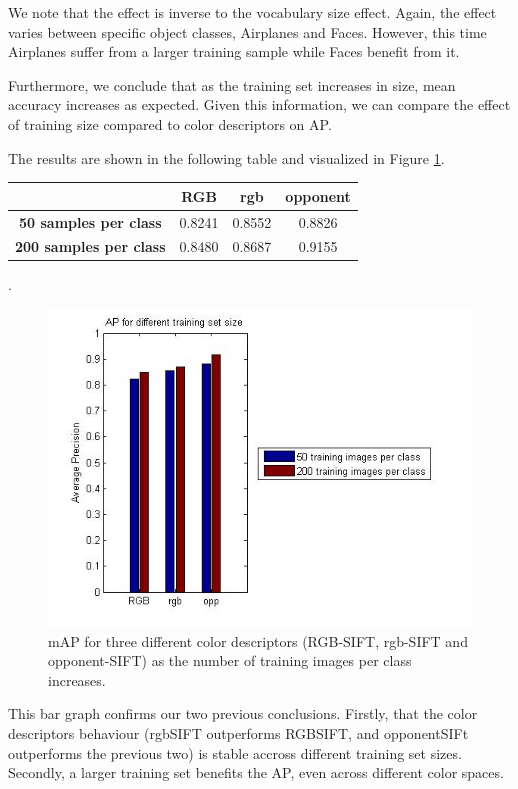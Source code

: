 \documentclass[11pt]{article}
\begin{document}
We note that the effect is inverse to the vocabulary size effect. Again, the effect varies between specific object classes, Airplanes and Faces. However, this time Airplanes suffer from a larger training sample while Faces benefit from it. 

Furthermore, we conclude that as the training set increases in size, mean accuracy increases as expected. Given this information, we can compare the effect of training size compared to color descriptors on AP.

The results are shown in the following table and visualized in Figure \ref{fig:training_size_color}.

\begin{center}
	\begin{tabular}{| c | c | c | c |}
		\hline
		\textbf{} & \textbf{RGB} & \textbf{rgb} & \textbf{opponent} \\ \hline
		\textbf{50 samples per class} & 0.8241 & 0.8552 & 0.8826 \\ \hline
		\textbf{200 samples per class} & 0.8480 & 0.8687 & 0.9155 \\ \hline
		\hline
	\end{tabular}
\end{center}
. 
\begin{figure}[h]
	\centering
	\includegraphics[width=.8\textwidth]{img/training_size_color_descriptor.jpg}
	\caption{mAP for three different color descriptors (RGB-SIFT, rgb-SIFT and opponent-SIFT) as the number of training images per class increases.}
	\label{fig:training_size_color}
\end{figure}

This bar graph confirms our two previous conclusions. Firstly, that the color descriptors behaviour (rgbSIFT outperforms RGBSIFT, and opponentSIFt outperforms the previous two) is stable accross different training set sizes. Secondly, a larger training set benefits the AP, even across different color spaces. 
\end{document}
